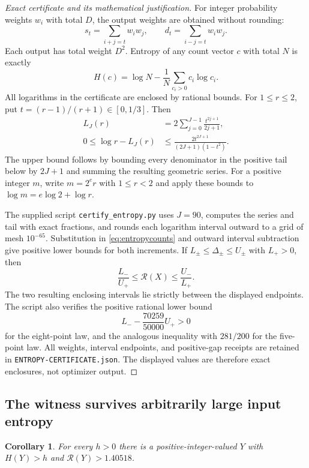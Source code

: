 \documentclass[11pt]{article}
\newtheorem{corollary}[theorem]{Corollary}
\theoremstyle{remark}
\begin{document}
\begin{proof}[Exact certificate and its mathematical justification]
For integer probability weights $w_i$ with total $D$, the output weights
are obtained without rounding:
\[
 s_t=\sum_{i+j=t}w_iw_j,\qquad
 d_t=\sum_{i-j=t}w_iw_j.
\]
Each output has total weight $D^2$. Entropy of any count vector $c$ with
total $N$ is exactly
\begin{equation}\label{eq:entropycounts}
 H(c)=\log N-\frac1N\sum_{c_i>0}c_i\log c_i.
\end{equation}
All logarithms in the certificate are enclosed by rational bounds.
For $1\leq r\leq2$, put $t=(r-1)/(r+1)\in[0,1/3]$. Then
\begin{align}
 L_J(r)&=2\sum_{j=0}^{J-1}\frac{t^{2j+1}}{2j+1},\\
 0\leq\log r-L_J(r)&\leq
 \frac{2t^{2J+1}}{(2J+1)(1-t^2)}.\label{eq:logtail}
\end{align}
The upper bound follows by bounding every denominator in the positive
tail below by $2J+1$ and summing the resulting geometric series.
For a positive integer $m$, write $m=2^e r$ with $1\leq r<2$ and apply
these bounds to $\log m=e\log2+\log r$.

The supplied script \texttt{certify\_entropy.py} uses $J=90$, computes the
series and tail with exact fractions, and rounds each logarithm interval
outward to a grid of mesh $10^{-65}$. Substitution in
\eqref{eq:entropycounts} and outward interval subtraction give positive
lower bounds for both increments. If $L_\pm\leq\Delta_\pm\leq U_\pm$
with $L_+>0$, then
\[
 \frac{L_-}{U_+}\leq\mathcal R(X)\leq\frac{U_-}{L_+}.
\]
The two resulting enclosing intervals lie strictly between the displayed
endpoints. The script also verifies the positive rational lower bound
\[
 L_- -\frac{70259}{50000}U_+>0
\]
for the eight-point law, and the analogous inequality with $281/200$ for
the five-point law. All weights, interval endpoints, and positive-gap
receipts are retained in \texttt{ENTROPY-CERTIFICATE.json}.
The displayed values are therefore exact enclosures, not optimizer output.
\end{proof}

\subsection{The witness survives arbitrarily large input entropy}

\begin{corollary}\label{cor:radix}
For every $h>0$ there is a positive-integer-valued $Y$ with $H(Y)>h$ and
$\mathcal R(Y)>1.40518$.
\end{corollary}
\end{document}
